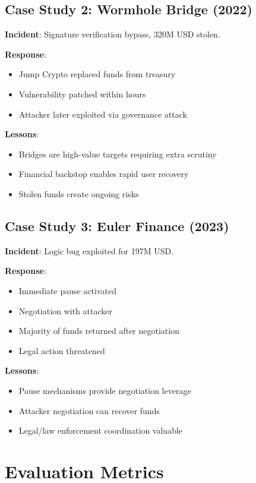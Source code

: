 \documentclass[11pt,a4paper]{article}
\theoremstyle{definition}
\begin{document}
\subsection{Case Study 2: Wormhole Bridge (2022)}

\textbf{Incident}: Signature verification bypass, 320M USD stolen.

\textbf{Response}:
\begin{itemize}
    \item Jump Crypto replaced funds from treasury
    \item Vulnerability patched within hours
    \item Attacker later exploited via governance attack
\end{itemize}

\textbf{Lessons}:
\begin{itemize}
    \item Bridges are high-value targets requiring extra scrutiny
    \item Financial backstop enables rapid user recovery
    \item Stolen funds create ongoing risks
\end{itemize}

\subsection{Case Study 3: Euler Finance (2023)}

\textbf{Incident}: Logic bug exploited for 197M USD.

\textbf{Response}:
\begin{itemize}
    \item Immediate pause activated
    \item Negotiation with attacker
    \item Majority of funds returned after negotiation
    \item Legal action threatened
\end{itemize}

\textbf{Lessons}:
\begin{itemize}
    \item Pause mechanisms provide negotiation leverage
    \item Attacker negotiation can recover funds
    \item Legal/law enforcement coordination valuable
\end{itemize}

\section{Evaluation Metrics}
\end{document}
